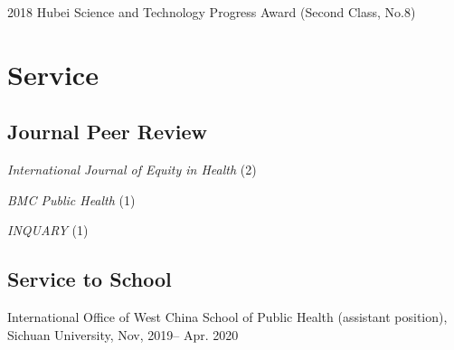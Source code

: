 \documentclass[12pt,letterpaper]{report}
\newcommand{\listitemspace}{0.35em}
\renewenvironment{itemize}
{\begin{list}{}{\setlength{\leftmargin}{0em}
            \setlength{\parskip}{0em}
            \setlength{\itemsep}{\listitemspace}
            \setlength{\parsep}{\listitemspace}}}
    {\end{list}}
\begin{document}
    \begin{tablist}
      
        \item[2018] \tab Hubei Science and Technology Progress Award (Second Class, No.8)

     \end{tablist}



        

   
    \section*{Service}

    \subsection*{Journal Peer Review}

    \begin{itemize}
        
        \item \textit{International Journal of Equity in Health} (2)
        \item \textit{BMC Public Health} (1)
        \item  \textit{INQUARY} (1)
       
    \end{itemize}

	
    \subsection*{Service to School}

    \begin{itemize}
    	
    	\item International Office of West China School of Public Health (assistant position), Sichuan University, Nov, 2019-- Apr. 2020
       
    \end{itemize}
	
\end{document}
